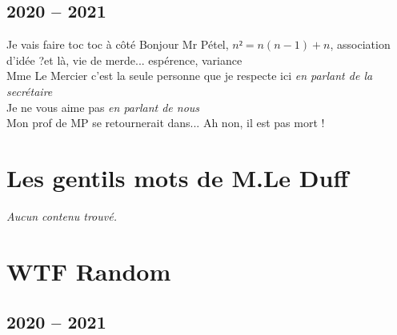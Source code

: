 \documentclass[french, a4paper, openany]{book}
\begin{document}
\section{2020 -- 2021}

	\noindent \og Je vais faire toc toc à côté \fg Bonjour Mr Pétel, $n² = n(n-1) + n$, association d'idée ?\og et là, vie de merde... \fg espérence, variance\og \fg \\
	\og Mme Le Mercier c'est la seule personne que je respecte ici \fg \emph{en parlant de la secrétaire} \\
	\og Je ne vous aime pas \fg \emph{en parlant de nous} \\
	\og Mon prof de MP se retournerait dans... Ah non, il est pas mort ! \fg \\

\chapter{Les gentils mots de M.Le Duff}

	 \noindent \emph{Aucun contenu trouvé.} \\
 
\chapter{WTF Random}

\section{2020 -- 2021}
\end{document}
